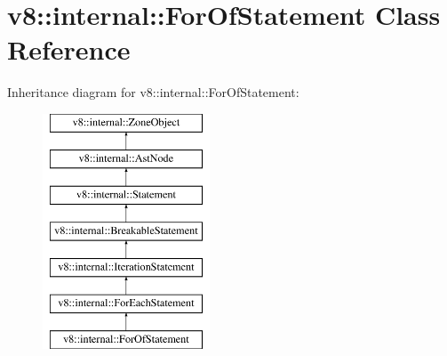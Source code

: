 \hypertarget{classv8_1_1internal_1_1ForOfStatement}{}\section{v8\+:\+:internal\+:\+:For\+Of\+Statement Class Reference}
\label{classv8_1_1internal_1_1ForOfStatement}
Inheritance diagram for v8\+:\+:internal\+:\+:For\+Of\+Statement\+:\begin{figure}[H]
\begin{center}
\leavevmode
\includegraphics[height=7.000000cm]{classv8_1_1internal_1_1ForOfStatement}
\end{center}
\end{figure}
